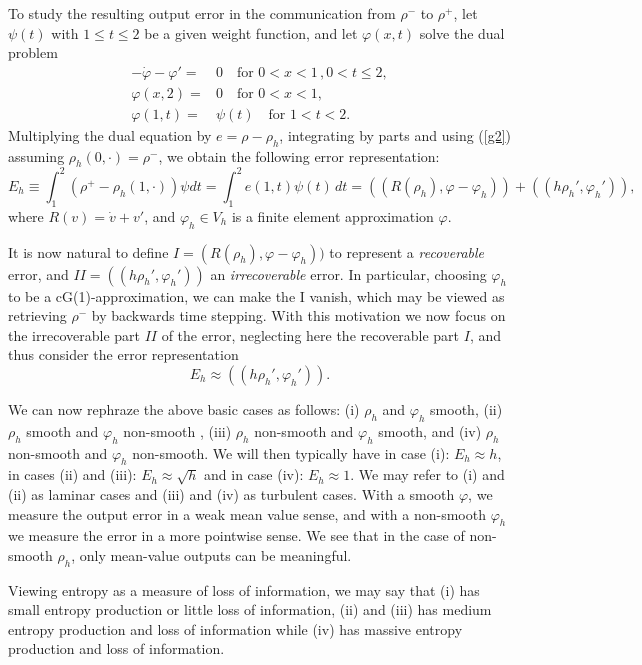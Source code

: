To study the resulting output error in the communication from
$\rho^-$ to $\rho^+$,  
let $\psi (t)$ with $1\le t\le 2$ be a given weight function,
and let $\varphi (x,t)$ solve the dual problem
\begin{equation}
\begin{split}
-\dot\varphi - \varphi '=&0\quad \mbox{for } 0<x<1\, ,0<t\le 2,\\
\varphi (x,2)=&0 \quad \mbox{for } 0<x<1,\\
\varphi (1,t)=&\psi (t) \quad \mbox{for } 1<t<2.
\end{split} 
\end{equation}
Multiplying the dual equation by $e=\rho -\rho_h$, integrating by parts
and using (\ref{g2}) assuming $\rho_h(0,\cdot )=\rho^-$, we obtain 
the following error representation:
\[
E_h\equiv \int_1^2(\rho^+-\rho_h(1,\cdot ))\psi dt=\int_1^2e(1,t)\psi (t)\, dt=((R(\rho_h),\varphi -\varphi_h))
+((h\rho_h' ,\varphi_h')),
\]
where $R(v)=\dot v+v'$, and $\varphi_h\in V_h$ is a finite element 
approximation $\varphi$. 

It is now natural to define $I=(R(\rho_h),\varphi -\varphi_h))$ 
to represent a \emph{recoverable} error, and 
$II=((h\rho_h' ,\varphi_h'))$ an \emph{irrecoverable} error.
In particular, 
choosing $\varphi_h$ to be a cG(1)-approximation,
we can make the I vanish, which may be viewed as 
retrieving $\rho^-$ by backwards time stepping. With this motivation
we now focus on the irrecoverable part $II$ of the error, neglecting
here the recoverable part $I$, and thus consider the error representation
\begin{equation}\label{error}
E_h\approx ((h\rho_h' ,\varphi_h')).
\end{equation}


We can now rephraze the above basic cases as follows: 
(i) $\rho_h$ and $\varphi_h$ smooth,
(ii) $\rho_h$ smooth and $\varphi_h$ non-smooth , (iii) 
$\rho_h$ non-smooth and $\varphi_h$ smooth, and (iv)
$\rho_h$ non-smooth and $\varphi_h$ non-smooth. We will then typically have
in case (i): $E_h\approx h$, in cases (ii) and (iii): $E_h\approx\sqrt{h}$
and in case (iv): $E_h\approx 1$. 
We may refer to (i) and (ii) as laminar cases and (iii) and (iv)
as turbulent cases. With a smooth $\varphi$, we measure 
the output error in a weak mean value sense, and with a non-smooth
$\varphi_h$ we measure the error in a more pointwise sense. 
We see that in the case of non-smooth $\rho_h$, 
only mean-value outputs can be meaningful.

Viewing entropy as a measure of loss of information, we may say
that (i) has small entropy production or little loss of information, 
(ii) and (iii) has medium entropy production and loss of information
while (iv) has massive entropy production and loss of information.


